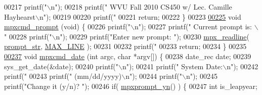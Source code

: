 \begin{DoxyCode}
{{{{{{{{{{{00217         printf(\textcolor{stringliteral}{"\(\backslash\)n"});
00218         printf(\textcolor{stringliteral}{"  WVU Fall 2010 CS450 w/ Lec. Camille Hayhearst\(\backslash\)n"});
00219 
00220         printf(\textcolor{stringliteral}{"%
00221         \textcolor{keywordflow}{return};
00222 \}
00223 
\hypertarget{mpx__cmd_8c_source_l00225}{}\hyperlink{mpx__cmd_8h_a0a04805761cf7c183609e1383a4c4975}{00225} \textcolor{keywordtype}{void} \hyperlink{mpx__cmd_8c_a0a04805761cf7c183609e1383a4c4975}{mpxcmd_prompt} (\textcolor{keywordtype}{void}) \{
00226         printf(\textcolor{stringliteral}{"\(\backslash\)n"});
00227         printf(\textcolor{stringliteral}{"  Current prompt is: \(\backslash\)"%
00228         printf(\textcolor{stringliteral}{"\(\backslash\)n"});
00229         printf(\textcolor{stringliteral}{"Enter new prompt: "});
00230         \hyperlink{mpx__util_8c_a781169ab05ad54c0d37253d73060b77f}{mpx_readline}( \hyperlink{mpx__cmd_8c_a4d455760d7d89fa6a1c1559f7b6acdf7}{prompt_str}, \hyperlink{mpx__cmd_8h_a842ed03f27719bc87666bfd1f75415b8}{MAX_LINE} );
00231 
00232         printf(\textcolor{stringliteral}{"%
00233         \textcolor{keywordflow}{return};
00234 \}
00235 
\hypertarget{mpx__cmd_8c_source_l00237}{}\hyperlink{mpx__cmd_8h_a8959742dda38733f33da60a56cb07373}{00237} \textcolor{keywordtype}{void} \hyperlink{mpx__cmd_8c_a8959742dda38733f33da60a56cb07373}{mpxcmd_date} (\textcolor{keywordtype}{int} argc, \textcolor{keywordtype}{char} *argv[]) \{
00238         date\_rec date;
00239         sys\_get\_date(&date);
00240         printf(\textcolor{stringliteral}{"\(\backslash\)n"});
00241         printf(\textcolor{stringliteral}{"  System Date:\(\backslash\)n"});
00242         printf(\textcolor{stringliteral}{"    %
00243         printf(\textcolor{stringliteral}{"   (mm/dd/yyyy)\(\backslash\)n"});
00244         printf(\textcolor{stringliteral}{"\(\backslash\)n"});
00245         printf(\textcolor{stringliteral}{"Change it (y/n)? "});
00246         \textcolor{keywordflow}{if}( \hyperlink{mpx__util_8c_a8e31250a20e8bc8e7106f5a37c391199}{mpxprompt_yn}() ) \{
00247                 \textcolor{keywordtype}{int} is\_leapyear;
}}}}}}}}}}}}}}}
\end{DoxyCode}
